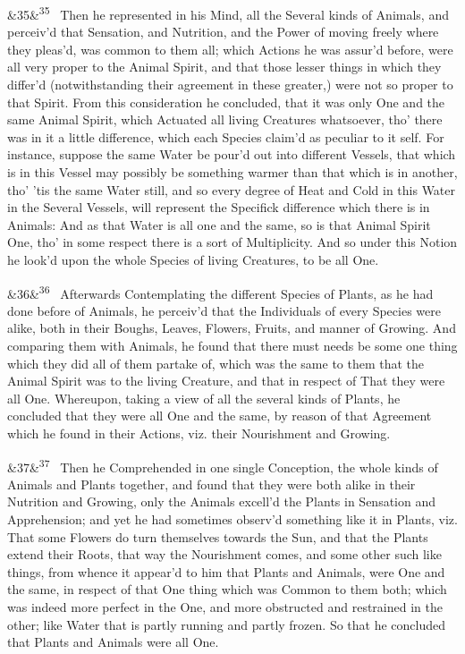 \documentclass[12pt]{article}
\newcommand{\para}[1][]{\par\noindent\ifx&#1&\else\textsuperscript{\footnotesize #1}~\fi}
\begin{document}
\para[35] Then he represented in his Mind, all the Several kinds of Animals, and perceiv'd that Sensation, and Nutrition, and the Power of moving freely where they pleas'd, was common to them all; which Actions he was assur'd before, were all very proper to the Animal Spirit, and that those lesser things in which they differ'd (notwithstanding their agreement in these greater,) were not so proper to that Spirit. From this consideration he concluded, that it was only One and the same Animal Spirit, which Actuated all living Creatures whatsoever, tho' there was in it a little difference, which each Species claim'd as peculiar to it self. For instance, suppose the same Water be pour'd out into different Vessels, that which is in this Vessel may possibly be something warmer than that which is in another, tho' 'tis the same Water still, and so every degree of Heat and Cold in this Water in the Several Vessels, will represent the Specifick difference which there is in Animals: And as that Water is all one and the same, so is that Animal Spirit One, tho' in some respect there is a sort of Multiplicity. And so under this Notion he look'd upon the whole Species of living Creatures, to be all One.

\para[36] Afterwards Contemplating the different Species of Plants, as he had done before of Animals, he perceiv'd that the Individuals of every Species were alike, both in their Boughs, Leaves, Flowers, Fruits, and manner of Growing. And comparing them with Animals, he found that there must needs be some one thing which they did all of them partake of, which was the same to them that the Animal Spirit was to the living Creature, and that in respect of That they were all One. Whereupon, taking a view of all the several kinds of Plants, he concluded that they were all One and the same, by reason of that Agreement which he found in their Actions, viz. their Nourishment and Growing.

\para[37] Then he Comprehended in one single Conception, the whole kinds of Animals and Plants together, and found that they were both alike in their Nutrition and Growing, only the Animals excell'd the Plants in Sensation and Apprehension; and yet he had sometimes observ'd something like it in Plants, viz. That some Flowers do turn themselves towards the Sun, and that the Plants extend their Roots, that way the Nourishment comes, and some other such like things, from whence it appear'd to him that Plants and Animals, were One and the same, in respect of that One thing which was Common to them both; which was indeed more perfect in the One, and more obstructed and restrained in the other; like Water that is partly running and partly frozen. So that he concluded that Plants and Animals were all One.
\end{document}
